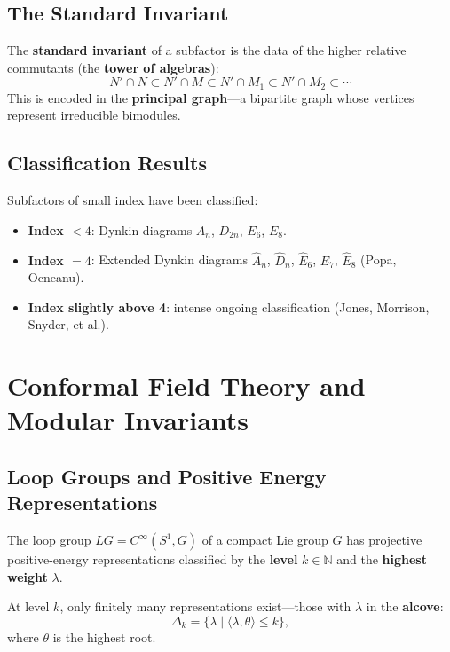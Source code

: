 \documentclass[11pt,a4paper]{article}
\begin{document}
\subsection{The Standard Invariant}

The \textbf{standard invariant} of a subfactor is the data of the
higher relative commutants (the \textbf{tower of algebras}):
\begin{equation}
  N' \cap N \subset N' \cap M \subset N' \cap M_1 \subset N' \cap M_2 \subset \cdots
\end{equation}
This is encoded in the \textbf{principal graph}---a bipartite graph whose
vertices represent irreducible bimodules.

\subsection{Classification Results}

Subfactors of small index have been classified:
\begin{itemize}[nosep]
  \item \textbf{Index $< 4$}: Dynkin diagrams $A_n$, $D_{2n}$, $E_6$, $E_8$.
  \item \textbf{Index $= 4$}: Extended Dynkin diagrams $\hat{A}_n$, $\hat{D}_n$,
        $\hat{E}_6$, $\hat{E}_7$, $\hat{E}_8$ (Popa, Ocneanu).
  \item \textbf{Index slightly above 4}: intense ongoing classification
        (Jones, Morrison, Snyder, et al.).
\end{itemize}

\section{Conformal Field Theory and Modular Invariants}

\subsection{Loop Groups and Positive Energy Representations}

The loop group $LG = C^\infty(S^1, G)$ of a compact Lie group $G$ has
projective positive-energy representations classified by the \textbf{level}
$k \in \mathbb{N}$ and the \textbf{highest weight} $\lambda$.

At level $k$, only finitely many representations exist---those with
$\lambda$ in the \textbf{alcove}:
\begin{equation}
  \Delta_k = \{\lambda \mid \langle \lambda, \theta \rangle \leq k\},
\end{equation}
where $\theta$ is the highest root.
\end{document}
